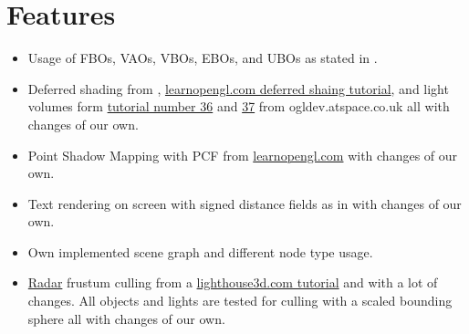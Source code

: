 \documentclass[12pt]{article}
\begin{document}
\section{Features \label{features}}
\begin{itemize}
	\item Usage of FBOs, VAOs, VBOs, EBOs, and UBOs as stated in \cite{openGLSuperBible}.

	\item Deferred shading from \cite{openGLSuperBible}, \href{http://learnopengl.com/#!Advanced-Lighting/Deferred-Shading}{learnopengl.com deferred shaing tutorial}, and light volumes form \href{http://ogldev.atspace.co.uk/www/tutorial36/tutorial36.html}{tutorial number 36} and \href{http://ogldev.atspace.co.uk/www/tutorial37/tutorial37.html}{37} from ogldev.atspace.co.uk all with changes of our own.

  \item Point Shadow Mapping with PCF from \href{https://learnopengl.com/#!Advanced-Lighting/Shadows/Point-Shadows}{learnopengl.com} with changes of our own.

	\item Text rendering on screen with signed distance fields as in \cite{signedDistanceFields} with changes of our own.

	\item Own implemented scene graph and different node type usage.

  \item \href{https://www.youtube.com/watch?v=2LW9JSYn_h0}{Radar} frustum culling from a \href{http://www.lighthouse3d.com/tutorials/view-frustum-culling/radar-approach-implementation-ii}{lighthouse3d.com tutorial} and \cite{gems5} with a lot of changes. All objects and lights are tested for culling with a scaled bounding sphere all with changes of our own.


\end{itemize}
\end{document}
